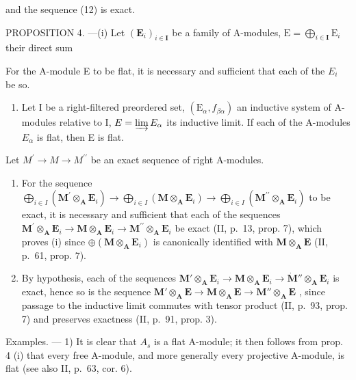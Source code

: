 and the sequence (12) is exact.

PROPOSITION 4. ---(i) Let \((\mathbf{E}_i)_{i\in \mathbf{I}}\) be a family of A-modules, \(\mathrm{E} = \bigoplus_{i\in \mathbf{I}}\mathrm{E}_i\) their direct sum

For the A-module E to be flat, it is necessary and sufficient that each of the \(E_{i}\) be so.

\begin{enumerate}
\def\labelenumi{(\roman{enumi})}
\setcounter{enumi}{1}
\tightlist
\item
  Let I be a right-filtered preordered set, \((\mathrm{E}_{\alpha}, f_{\beta\alpha})\) an inductive system of A-modules relative to I, \(E = \varinjlim E_{\alpha}\) its inductive limit. If each of the A-modules \(E_{\alpha}\) is flat, then E is flat.
\end{enumerate}

Let \(M^{\prime} \rightarrow M \rightarrow M^{\prime\prime}\) be an exact sequence of right A-modules.

\begin{enumerate}
\def\labelenumi{(\roman{enumi})}
\item
  For the sequence \(\bigoplus_{i\in I}(\mathbf{M}^{\prime}\otimes_{\mathbf{A}}\mathbf{E}_{i})\to \bigoplus_{i\in I}(\mathbf{M}\otimes_{\mathbf{A}}\mathbf{E}_{i})\to \bigoplus_{i\in I}(\mathbf{M}^{\prime \prime}\otimes_{\mathbf{A}}\mathbf{E}_{i})\) to be exact, it is necessary and sufficient that each of the sequences \(\mathbf{M}^{\prime}\otimes_{\mathbf{A}}\mathbf{E}_{i}\to \mathbf{M}\otimes_{\mathbf{A}}\mathbf{E}_{i}\to \mathbf{M}^{\prime \prime}\otimes_{\mathbf{A}}\mathbf{E}_{i}\) be exact (II, p.~13, prop. 7), which proves (i) since \(\oplus (\mathbf{M}\otimes_{\mathbf{A}}\mathbf{E}_{i})\) is canonically identified with \(\mathbf{M}\otimes_{\mathbf{A}}\mathbf{E}\) (II, p.~61, prop. 7).
\item
  By hypothesis, each of the sequences \(\mathbf{M}' \otimes_{\mathbf{A}} \mathbf{E}_i \to \mathbf{M} \otimes_{\mathbf{A}} \mathbf{E}_i \to \dot{\mathbf{M}}'' \otimes_{\mathbf{A}} \mathbf{E}_i\) is exact, hence so is the sequence \(\mathbf{M}' \otimes_{\mathbf{A}} \mathbf{E} \to \mathbf{M} \otimes_{\mathbf{A}} \mathbf{E} \to \mathbf{M}'' \otimes_{\mathbf{A}} \mathbf{E}\) , since passage to the inductive limit commutes with tensor product (II, p.~93, prop. 7) and preserves exactness (II, p.~91, prop. 3).
\end{enumerate}

Examples. --- 1) It is clear that \(A_{s}\) is a flat A-module; it then follows from prop. 4 (i) that every free A-module, and more generally every projective A-module, is flat (see also II, p.~63, cor. 6).

